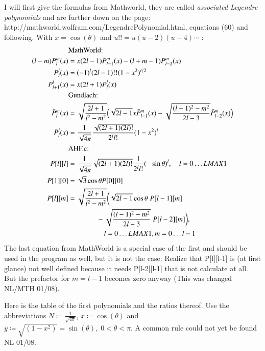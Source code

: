 \documentclass[11pt,a4paper,twoside]{article}
\begin{document}
I will first give the formulas from Mathworld, they are called 
\emph{associated Legendre polynomials} and are further down on the page:
http://mathworld.\-wolfram.com/\-LegendrePolynomial.html, equations (60) and
following. With $x=\cos(\theta)$ and $u!!=u (u-2) (u-4)\cdots$ \;:
\begin{align}
  &\text{MathWorld:}\notag\\
  (l-m)P^m_l(x) &= x (2l-1) P^m_{l-1}(x) -(l+m-1) P^m_{l-2}(x)\\
  P^l_l(x) &= (-1)^l (2l-1)!!(1-x^2)^{l/2}\\
  P^l_{l+1}(x) &=x(2l+1) P^l_l(x) \\
  &\text{Gundlach:}\notag\\
  \bar P^m_l(x) &=\sqrt{\frac{2l+1}{l^2-m^2}}\Big(
    \sqrt{2l-1} x \bar P^m_{l-1}(x) 
    -\sqrt{\frac {(l-1)^2-m^2}{2l-3}} \bar P^m_{l-2}(x) \Big)\\
  \bar P^l_l(x)&=\frac 1 {\sqrt{4 \pi}} \frac {\sqrt{(2l+1)(2l)!}}{2^l l!}(1-x^2)^l\\
  &\text{AHF.c:}\notag\\  
  P[l][l] &= \frac 1 {\sqrt{4 \pi}} \sqrt{(2l+1) (2l)!}\frac 1 {2^l l!} 
             (-\sin\theta)^l, \quad l=0\dots LMAX1\\
  P[1][0] &= \sqrt{3} \cos\theta P[0][0] \quad \\
  P[l][m] &= \sqrt{\frac {2l+1} {l^2-m^2}} 
              \biggl(\sqrt{2l-1} \cos\theta\; P[l-1][m] \notag\\
          &\qquad \qquad  -\sqrt{\frac {(l-1)^2-m^2} {2l-3}} \;P[l-2][m]\biggr)
          , \notag\\ 
          &\qquad \qquad \quad l=0\dots LMAX1, m=0\dots l-1
\end{align}
The last equation from MathWorld is a special case of the first and should be used 
in the program as well, but it is not the case:
Realize that P[l][l-1] is (at first glance) not well defined because it
needs P[l-2][l-1] that is not calculate at all. But the prefactor for 
$m=l-1$ becomes zero anyway (This was changed NL/MTH 01/08).


Here is the table of the first polynomials and the ratios thereof. Use the 
abbreviations $N\coloneqq \frac 1 {\sqrt{4\pi}}$, $x \coloneqq \cos(\theta)$
and $y \coloneqq \sqrt{(1-x^2)} = \sin(\theta), \;0<\theta<\pi$.
A common rule could not yet be found NL 01/08.
\end{document}
